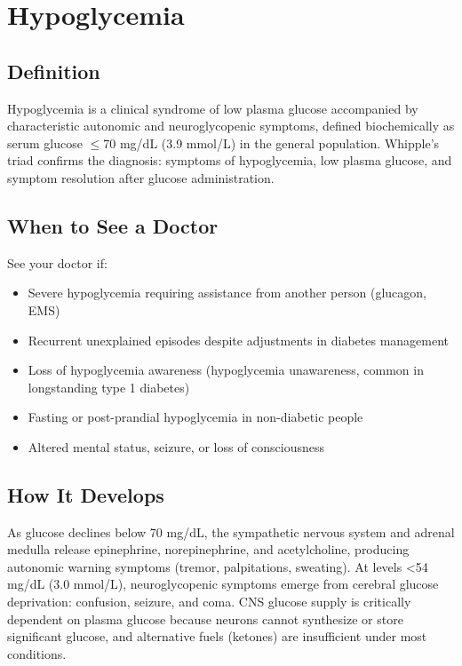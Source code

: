 \chapter{Hypoglycemia}

\section*{Definition}
Hypoglycemia is a clinical syndrome of low plasma glucose accompanied by characteristic autonomic and neuroglycopenic symptoms, defined biochemically as serum glucose \ensuremath{\leq}70 mg/dL (3.9 mmol/L) in the general population. Whipple's triad confirms the diagnosis: symptoms of hypoglycemia, low plasma glucose, and symptom resolution after glucose administration.

\section*{When to See a Doctor}
See your doctor if:
\begin{itemize}
  \item Severe hypoglycemia requiring assistance from another person (glucagon, EMS)
  \item Recurrent unexplained episodes despite adjustments in diabetes management
  \item Loss of hypoglycemia awareness (hypoglycemia unawareness, common in longstanding type 1 diabetes)
  \item Fasting or post-prandial hypoglycemia in non-diabetic people
  \item Altered mental status, seizure, or loss of consciousness
\end{itemize}

\section*{How It Develops}
As glucose declines below 70 mg/dL, the sympathetic nervous system and adrenal medulla release epinephrine, norepinephrine, and acetylcholine, producing autonomic warning symptoms (tremor, palpitations, sweating). At levels <54 mg/dL (3.0 mmol/L), neuroglycopenic symptoms emerge from cerebral glucose deprivation: confusion, seizure, and coma. CNS glucose supply is critically dependent on plasma glucose because neurons cannot synthesize or store significant glucose, and alternative fuels (ketones) are insufficient under most conditions.

